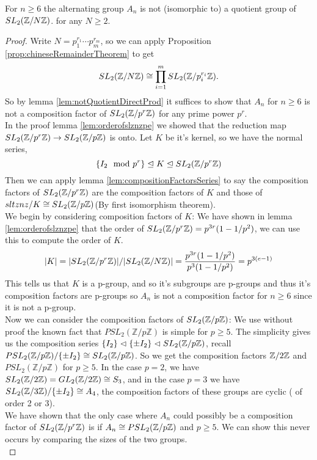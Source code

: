\begin{theorem}\label{thm:annotquotientsltznz}
For $n \geq 6$ the alternating group $A_n$ is not (isomorphic to) a quotient group of $\sltznz$. for any $N \geq 2$.
\end{theorem}
\begin{proof}
Write $N = p_1^{r_1} \cdots p_m^{r_m}$, so we can apply Proposition \ref{prop:chineseRemainderTheorem} to get 
$$ \sltznz \cong \prod_{i=1}^m \sltznz[p_i^{r_i}].$$
So by lemma \ref{lem:notQuotientDirectProd} it suffices to show that $A_n$ for $n \geq 6$ is not a composition factor of $\sltznz[p^r]$ for any prime power $p^r$.\\
In the proof lemma \ref{lem:orderofslznzpe} we showed that the reduction map $\sltznz[p^r] \rightarrow \sltznz[p]$ is onto. Let $K$ be it's kernel, so we have the normal series, 
$$\{ I_2 \mod p^r \} \trianglelefteq K \trianglelefteq \sltznz[p^r]$$
Then we can apply lemma \ref{lem:compositionFactorsSeries} to say the composition factors of $\sltznz[p^r]$ are the composition factors of $K$ and those of $sltznz / K \cong \sltznz[p]$(By first isomorphism theorem).\\
We begin by considering composition factors of $K$: We have shown in lemma \ref{lem:orderofslznzpe} that the order of $\sltznz[p^r] = p^{3r}(1 - 1/p^2)$, we can use this to compute the order of $K$.
$$\vert K \vert  = \vert \sltznz[p^r] \vert / \vert \sltznz  \vert = \frac{p^{3r}(1 - 1/p^2)}{p^{3}(1 - 1/p^2)} = p^{3(e-1)}$$
This tells us that $K$ is a p-group, and so it's subgroups are p-groups and thus it's composition factors are p-groups so $A_n$ is not a composition factor for $n \geq 6$ since it is not a p-group. \\
Now we can consider the composition factors of $\sltznz[p]$: We use without proof the known fact that $PSL_2(\mathbb{Z}/p\mathbb{Z})$ is simple for $p \geq 5$. The simplicity gives us the composition series $\{I_2\} \vartriangleleft \{\pm I_2 \} \vartriangleleft \sltznz[p]$, recall $ PSL_2(\mathbb{Z}/p\mathbb{Z}) / \{\pm I_2\} \cong \sltznz[p]$. So we get the composition factors $\znz[2]$ and $PSL_2(\mathbb{Z}/p\mathbb{Z})$ for $p \geq 5$. In the case $p =2$, we have $\sltznz[2] = GL_2(\mathbb{Z}/2\mathbb{Z}) \cong S_3$, and in the case $p = 3$ we have $\sltznz[3] /\{\pm I_2\} \cong A_4$, the composition factors of these groups are cyclic ( of order 2 or 3).
\\
We have shown that the only case where $A_n$ could possibly be a composition factor of $\sltznz[p^r]$ is if $A_n \cong \psltznz[p]$ and $p\geq5$. We can show this never occurs by comparing the sizes of the two groups. \\

\end{proof}
